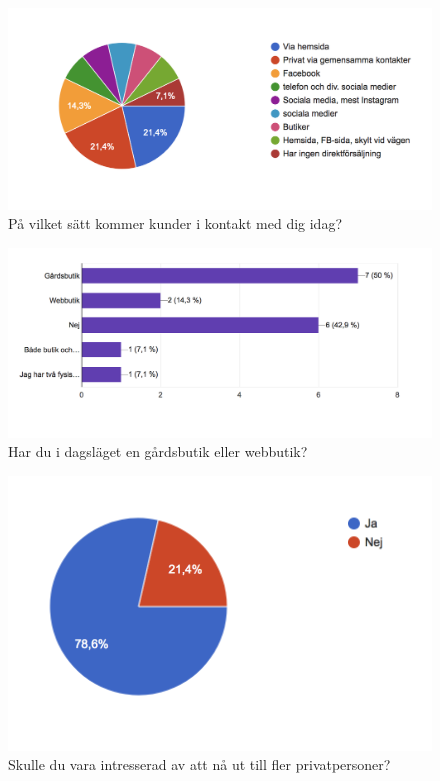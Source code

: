 \documentclass[10pt,a4paper,oneside]{article}
\begin{document}
\begin{figure}
	\includegraphics[scale=0.6]{4.png}
	\caption{P\r{a} vilket s\"att kommer kunder i kontakt med dig idag?}
\end{figure}

\begin{figure}
	\includegraphics[scale=0.6]{5.png}
	\caption{Har du i dagsl\"aget en g\r{a}rdsbutik eller webbutik?}
\end{figure}

\begin{figure}
	\includegraphics[scale=0.6]{6.png}
	\caption{Skulle du vara intresserad av att n\r{a} ut till fler privatpersoner?}
\end{figure}
\end{document}

